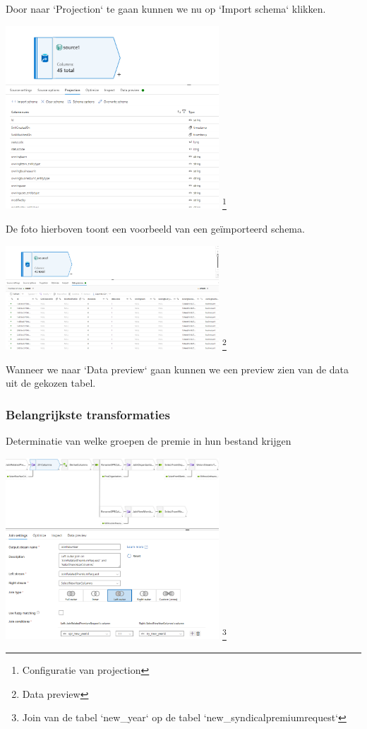 Door naar `Projection` te gaan kunnen we nu op `Import schema` klikken.

\begin{center}
    \includegraphics[width=0.6\textwidth]{./graphics/adf/source_table_7_specific.png}
    \footnote{Configuratie van projection}
\end{center}

De foto hierboven toont een voorbeeld van een geïmporteerd schema.

\begin{center}
    \includegraphics[width=0.6\textwidth]{./graphics/adf/source_table_8_specific.png}
    \footnote{Data preview}
\end{center}

Wanneer we naar `Data preview` gaan kunnen we een preview zien van de data uit de gekozen tabel.

\subsubsection{Belangrijkste transformaties}

Determinatie van welke groepen de premie in hun bestand krijgen

\begin{center}
    \includegraphics[width=0.6\textwidth]{./graphics/adf/bepalen_groep_1.png}
    \footnote{Join van de tabel `new\_year` op de tabel `new\_syndicalpremiumrequest`}
\end{center}

